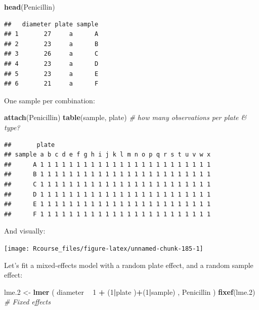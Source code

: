 \documentclass[]{book}
\newenvironment{Shaded}{\begin{snugshade}}{\end{snugshade}}
\newcommand{\KeywordTok}[1]{\textcolor[rgb]{0.13,0.29,0.53}{\textbf{#1}}}
\newcommand{\DecValTok}[1]{\textcolor[rgb]{0.00,0.00,0.81}{#1}}
\newcommand{\StringTok}[1]{\textcolor[rgb]{0.31,0.60,0.02}{#1}}
\newcommand{\CommentTok}[1]{\textcolor[rgb]{0.56,0.35,0.01}{\textit{#1}}}
\newcommand{\OperatorTok}[1]{\textcolor[rgb]{0.81,0.36,0.00}{\textbf{#1}}}
\newcommand{\NormalTok}[1]{#1}
\theoremstyle{definition}
\theoremstyle{definition}
\theoremstyle{definition}
\theoremstyle{remark}
\begin{document}
\begin{Shaded}
\begin{Highlighting}[]
\KeywordTok{head}\NormalTok{(Penicillin)}
\end{Highlighting}
\end{Shaded}

\begin{verbatim}
##   diameter plate sample
## 1       27     a      A
## 2       23     a      B
## 3       26     a      C
## 4       23     a      D
## 5       23     a      E
## 6       21     a      F
\end{verbatim}

One sample per combination:

\begin{Shaded}
\begin{Highlighting}[]
\KeywordTok{attach}\NormalTok{(Penicillin)}
\KeywordTok{table}\NormalTok{(sample, plate) }\CommentTok{# how many observations per plate & type?}
\end{Highlighting}
\end{Shaded}

\begin{verbatim}
##       plate
## sample a b c d e f g h i j k l m n o p q r s t u v w x
##      A 1 1 1 1 1 1 1 1 1 1 1 1 1 1 1 1 1 1 1 1 1 1 1 1
##      B 1 1 1 1 1 1 1 1 1 1 1 1 1 1 1 1 1 1 1 1 1 1 1 1
##      C 1 1 1 1 1 1 1 1 1 1 1 1 1 1 1 1 1 1 1 1 1 1 1 1
##      D 1 1 1 1 1 1 1 1 1 1 1 1 1 1 1 1 1 1 1 1 1 1 1 1
##      E 1 1 1 1 1 1 1 1 1 1 1 1 1 1 1 1 1 1 1 1 1 1 1 1
##      F 1 1 1 1 1 1 1 1 1 1 1 1 1 1 1 1 1 1 1 1 1 1 1 1
\end{verbatim}

And visually:

\texttt{[image: Rcourse\_files/figure-latex/unnamed-chunk-185-1]}

Let's fit a mixed-effects model with a random plate effect, and a random
sample effect:

\begin{Shaded}
\begin{Highlighting}[]
\NormalTok{lme.}\DecValTok{2}\NormalTok{ <-}\StringTok{ }\KeywordTok{lmer}\NormalTok{ ( diameter }\OperatorTok{~}\StringTok{  }\DecValTok{1}  \OperatorTok{+}\StringTok{ }\NormalTok{(}\DecValTok{1}\OperatorTok{|}\NormalTok{plate )}\OperatorTok{+}\NormalTok{(}\DecValTok{1}\OperatorTok{|}\NormalTok{sample) , Penicillin )}
\KeywordTok{fixef}\NormalTok{(lme.}\DecValTok{2}\NormalTok{) }\CommentTok{# Fixed effects}
\end{Highlighting}
\end{Shaded}
\end{document}
